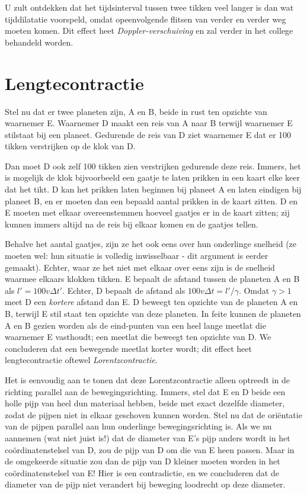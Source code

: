 U zult ontdekken dat het tijdsinterval tussen twee tikken veel langer
is dan wat tijddilatatie voorspeld, omdat
opeenvolgende flitsen van verder en verder weg moeten komen. Dit effect heet
{\it Doppler-verschuiving} en zal verder in het college behandeld
worden.

\section{Lengtecontractie} \label{s:contractie}
Stel nu dat er twee planeten zijn, A en B, beide in rust ten opzichte van  waarnemer E.
Waarnemer D maakt een reis van A naar B terwijl waarnemer E stilstaat bij een planeet.
Gedurende de reis van D ziet waarnemer E dat er 100 tikken verstrijken op de klok van D.
 
Dan moet D ook zelf 100 tikken zien verstrijken gedurende deze
reis. Immers, het is mogelijk de klok bijvoorbeeld een gaatje te laten
prikken in een kaart elke keer dat het tikt. D kan het prikken laten
beginnen bij planeet A en laten eindigen bij planeet B, en er moeten
dan een bepaald aantal prikken in de kaart zitten. D en E moeten met
elkaar overeenstemmen hoeveel gaatjes er in de kaart zitten; zij
kunnen immers altijd na de reis bij elkaar komen en de gaatjes tellen.

Behalve het aantal gaatjes, zijn ze het ook eens over hun onderlinge
snelheid (ze moeten wel: hun situatie is volledig inwisselbaar - dit
argument is eerder gemaakt). Echter, waar ze het niet met elkaar over
eens zijn is de snelheid waarmee elkaars klokken tikken. E bepaalt de
afstand tussen de planeten A en B als $l'=100 v \Delta t'$. Echter, 
D bepaalt de afstand als $100 v \Delta t = l'/\gamma$. Omdat $\gamma > 1$ meet
D een {\it kortere} afstand dan E.  D beweegt ten opzichte van de
planeten A en B, terwijl E stil staat ten opzichte van deze planeten.
In feite kunnen de planeten A en B gezien worden als de eind-punten
van een heel lange meetlat die waarnemer E vasthoudt; een meetlat die
beweegt ten opzichte van D.  We concluderen dat een bewegende meetlat
korter wordt; dit effect heet lengtecontractie oftewel 
{\it Lorentzcontractie}.

Het is eenvoudig aan te tonen dat deze Lorentzcontractie alleen
optreedt in de richting parallel aan de bewegingsrichting. Immers,
stel dat E en D beide een holle pijp van heel dun materiaal hebben, beide met exact dezelfde diameter, zodat de pijpen niet in elkaar geschoven kunnen worden.
Stel nu dat de ori\"entatie van de pijpen  parallel aan hun onderlinge
bewegingsrichting is. Als we nu aannemen (wat niet juist is!) dat
de diameter van E's pijp anders wordt in het co\"ordinatenstelsel van
D, zou de pijp van D om die van E heen passen. Maar in de omgekeerde situatie zou dan de pijp van D kleiner moeten worden in het co\"ordinatenstelsel van E!
Hier is een contradictie, en we concluderen dat de diameter van de
pijp niet verandert bij beweging loodrecht op deze diameter.


